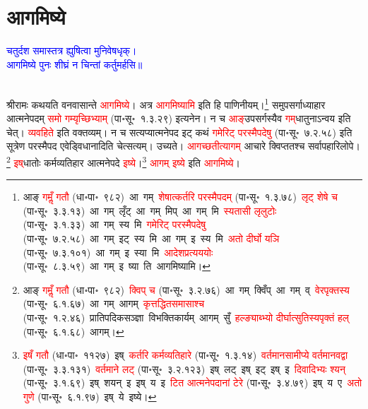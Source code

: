 \section[आगमिष्ये]{आगमिष्ये}
\centering\textcolor{blue}{चतुर्दश समास्तत्र ह्युषित्वा मुनिवेषधृक्।\nopagebreak\\
आगमिष्ये पुनः शीघ्रं न चिन्तां कर्तुमर्हसि॥}\nopagebreak\\
\\
\fontsize{14}{21}\selectfont\begin{sloppypar}\justifying\noindent\hspace{10mm} श्रीरामः कथयति वनवासान्ते \textcolor{red}{आगमिष्ये}। अत्र \textcolor{red}{आगमिष्यामि} इति हि पाणिनीयम्।\footnote{आङ् \textcolor{red}{गमॢँ गतौ} (धा॰पा॰~९८२)~\arrow आ~गम्~\arrow \textcolor{red}{शेषात्कर्तरि परस्मैपदम्} (पा॰सू॰~१.३.७८)~\arrow \textcolor{red}{लृट् शेषे च} (पा॰सू॰~३.३.१३)~\arrow आ~गम्~लृँट्~\arrow आ~गम्~मिप्~\arrow आ~गम्~मि~\arrow \textcolor{red}{स्यतासी लृलुटोः} (पा॰सू॰~३.१.३३)~\arrow आ~गम्~स्य~मि~\arrow \textcolor{red}{गमेरिट् परस्मैपदेषु} (पा॰सू॰~७.२.५८)~\arrow आ~गम्~इट्~स्य~मि~\arrow आ~गम्~इ~स्य~मि~\arrow \textcolor{red}{अतो दीर्घो यञि} (पा॰सू॰~७.३.१०१)~\arrow आ~गम्~इ~स्या~मि~\arrow \textcolor{red}{आदेशप्रत्यययोः} (पा॰सू॰~८.३.५९)~\arrow आ~गम्~इ~ष्या~ति~\arrow आगमिष्यामि।} समुपसर्गाध्याहार आत्मनेपदम् \textcolor{red}{समो गम्यृच्छिभ्याम्} (पा॰सू॰~१.३.२९) इत्यनेन। न च \textcolor{red}{आङ्‌}\-उपसर्गस्यैव \textcolor{red}{गम्‌}\-धातुनाऽन्वय इति चेत्। \textcolor{red}{व्यवहिते} इति वक्तव्यम्।
न च सत्यप्यात्मनेपद इट् कथं \textcolor{red}{गमेरिट् परस्मैपदेषु} (पा॰सू॰~७.२.५८) इति सूत्रेण परस्मैपद एवेड्विधानादिति चेत्सत्यम्। उच्यते। \textcolor{red}{आगच्छतीत्यागम्} आचारे क्विप्ततश्च सर्वापहारि\-लोपे।\footnote{आङ् \textcolor{red}{गमॢँ गतौ} (धा॰पा॰~९८२)~\arrow \textcolor{red}{क्विप् च} (पा॰सू॰~३.२.७६)~\arrow आ~गम्~क्विँप्~\arrow आ~गम्~व्~\arrow \textcolor{red}{वेरपृक्तस्य} (पा॰सू॰~६.१.६७)~\arrow आ~गम्~\arrow आगम्~\arrow \textcolor{red}{कृत्तद्धित\-समासाश्च} (पा॰सू॰~१.२.४६)~\arrow प्रातिपदिक\-सञ्ज्ञा~\arrow विभक्तिकार्यम्~\arrow आगम्~सुँ~\arrow \textcolor{red}{हल्ङ्याब्भ्यो दीर्घात्सुतिस्यपृक्तं हल्} (पा॰सू॰~६.१.६८)~\arrow आगम्।} \textcolor{red}{इष्‌}\-धातोः कर्म\-व्यतिहार आत्मनेपदे \textcolor{red}{इष्ये}।\footnote{\textcolor{red}{इषँ गतौ} (धा॰पा॰~११२७)~\arrow इष्~\arrow \textcolor{red}{कर्तरि कर्मव्यतिहारे} (पा॰सू॰~१.३.१४)~\arrow \textcolor{red}{वर्तमान\-सामीप्ये वर्तमानवद्वा} (पा॰सू॰~३.३.१३१)~\arrow \textcolor{red}{वर्तमाने लट्} (पा॰सू॰~३.२.१२३)~\arrow इष्~लट्~\arrow इष्~इट्~\arrow इष्~इ~\arrow \textcolor{red}{दिवादिभ्यः श्यन्} (पा॰सू॰~३.१.६९)~\arrow इष्~शयन्~इ~\arrow इष्~य~इ~\arrow \textcolor{red}{टित आत्मनेपदानां टेरे} (पा॰सू॰~३.४.७९)~\arrow इष्~य~ए~\arrow \textcolor{red}{अतो गुणे} (पा॰सू॰~६.१.९७)~\arrow इष्~ये~\arrow इष्ये।} \textcolor{red}{आगम् इष्ये} इति \textcolor{red}{आगमिष्ये}।\end{sloppypar}
